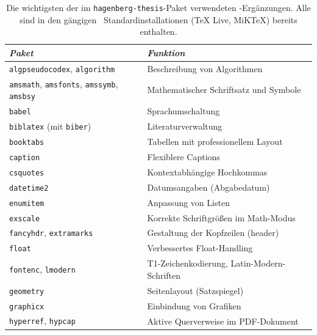 \begin{table}
    \caption{Die wichtigsten der im \texttt{hagenberg-thesis}-Paket
    verwendeten \latex-Ergänzungen. Alle sind in den gängigen \latex\
    Standardinstallationen (\zB TeX Live, MiKTeX) bereits enthalten.}
    \label{tab:packages}
    \centering\small
    \begin{tabular}{@{}ll@{}}
        \toprule
        \emph{Paket}          & \emph{Funktion} \\
        \midrule
        \texttt{algpseudocodex}, \texttt{algorithm} & Beschreibung von Algorithmen \\
        \texttt{amsmath}, \texttt{amsfonts},
        \texttt{amssymb}, \texttt{amsbsy}             & Mathematischer Schriftsatz und Symbole \\
        \texttt{babel}                                & Sprachumschaltung \\
        \texttt{biblatex} (mit \texttt{biber})        & Literaturverwaltung \\
        \texttt{booktabs}                             & Tabellen mit professionellem Layout \\
        \texttt{caption}                              & Flexiblere Captions \\
        \texttt{csquotes}                             & Kontextabhängige Hochkommas \\
        \texttt{datetime2}                            & Datumsangaben (\zB Abgabedatum) \\
        \texttt{enumitem}                             & Anpassung von Listen \\
        \texttt{exscale}                              & Korrekte Schriftgrößen im Math-Modus \\
        \texttt{fancyhdr}, \texttt{extramarks}        & Gestaltung der Kopfzeilen (header) \\
        \texttt{float}                                & Verbessertes Float-Handling \\
        \texttt{fontenc}, \texttt{lmodern}            & T1-Zeichenkodierung, Latin-Modern-Schriften \\
        \texttt{geometry}                             & Seitenlayout (Satzspiegel) \\
        \texttt{graphicx}                             & Einbindung von Grafiken \\
        \texttt{hyperref}, \texttt{hypcap}            & Aktive Querverweise im PDF-Dokument \\

\end{tabular}
\end{table}

